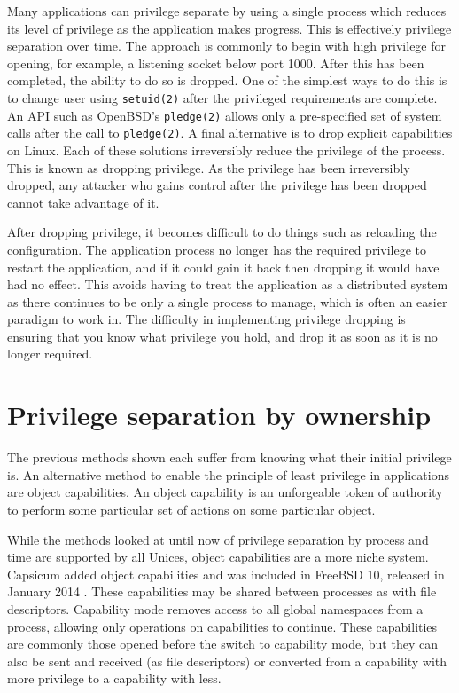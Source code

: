 \documentclass[12pt,a4paper,twoside]{report}
\begin{document}
Many applications can privilege separate by using a single process which reduces its level of privilege as the application makes progress. This is effectively privilege separation over time. The approach is commonly to begin with high privilege for opening, for example, a listening socket below port 1000. After this has been completed, the ability to do so is dropped. One of the simplest ways to do this is to change user using \texttt{setuid(2)} after the privileged requirements are complete. An API such as OpenBSD's \texttt{pledge(2)} allows only a pre-specified set of system calls after the call to \texttt{pledge(2)}. A final alternative is to drop explicit capabilities on Linux. Each of these solutions irreversibly reduce the privilege of the process. This is known as dropping privilege. As the privilege has been irreversibly dropped, any attacker who gains control after the privilege has been dropped cannot take advantage of it.

After dropping privilege, it becomes difficult to do things such as reloading the configuration. The application process no longer has the required privilege to restart the application, and if it could gain it back then dropping it would have had no effect. This avoids having to treat the application as a distributed system as there continues to be only a single process to manage, which is often an easier paradigm to work in. The difficulty in implementing privilege dropping is ensuring that you know what privilege you hold, and drop it as soon as it is no longer required.

\section{Privilege separation by ownership}

The previous methods shown each suffer from knowing what their initial privilege is. An alternative method to enable the principle of least privilege in applications are object capabilities. An object capability is an unforgeable token of authority to perform some particular set of actions on some particular object.

While the methods looked at until now of privilege separation by process and time are supported by all Unices, object capabilities are a more niche system. Capsicum added object capabilities and was included in FreeBSD 10, released in January 2014 \citep{watson_capsicum_2010}. These capabilities may be shared between processes as with file descriptors. Capability mode removes access to all global namespaces from a process, allowing only operations on capabilities to continue. These capabilities are commonly those opened before the switch to capability mode, but they can also be sent and received (as file descriptors) or converted from a capability with more privilege to a capability with less.
\end{document}
